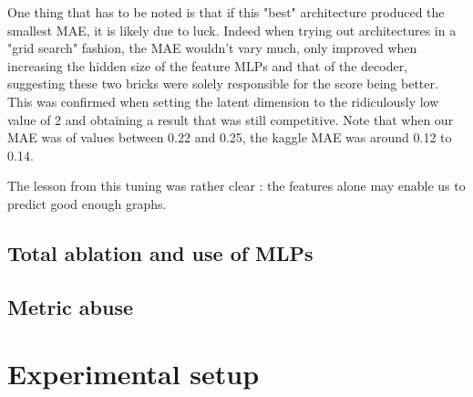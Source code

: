 \documentclass[10pt,twocolumn,letterpaper]{article}
\begin{document}
One thing that has to be noted is that if this "best" architecture produced the smallest MAE, it is likely due to luck. Indeed when trying out architectures in a "grid search" fashion, the MAE wouldn't vary much, only improved when increasing the hidden size of the feature MLPs and that of the decoder, suggesting these two bricks were solely responsible for the score being better. This was confirmed when setting the latent dimension to the ridiculously low value of 2 and obtaining a result that was still competitive. Note that when our MAE was of values between 0.22 and 0.25, the kaggle MAE was around 0.12 to 0.14.

\indent
The lesson from this tuning was rather clear : the features alone may enable us to predict good enough graphs.

\subsection{Total ablation and use of MLPs}
\label{subsec:mlps}

\subsection{Metric abuse}
\label{subsec:abuse}

\section{Experimental setup}
\label{sec:setup}



{\small


}
\end{document}
